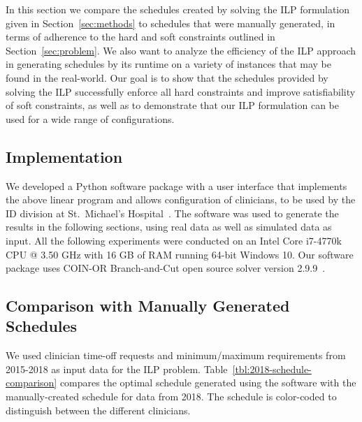 In this section we compare the schedules created by solving the ILP formulation
given in Section~\ref{sec:methods} to schedules that were manually generated,
in terms of adherence to the hard and soft constraints outlined in Section~\ref{sec:problem}.
We also want to analyze the efficiency of the ILP approach in generating schedules
by its runtime on a variety of instances that may be found in the real-world.
Our goal is to show that the schedules provided by solving the ILP successfully
enforce all hard constraints and improve satisfiability of soft constraints, 
as well as to demonstrate that our ILP formulation can be used for a wide range
of configurations.

\subsection{Implementation}
We developed a Python software package with a user interface that implements the above
linear program and allows configuration of clinicians, to be
used by the ID division at St.\ Michael's Hospital~\cite{landsman_scheduling}. 
The software was used to
generate the results in the following sections, using real data as well as
simulated data as input. All the following experiments were conducted on an
Intel Core i7-4770k CPU @ 3.50 GHz with 16 GB of RAM running 64-bit Windows 10.
Our software package uses COIN-OR Branch-and-Cut open source solver
version 2.9.9~\cite{johnjforrest_coin-or/cbc:_2019}.

\subsection{Comparison with Manually Generated Schedules}  %
We used clinician time-off requests and minimum/maximum requirements from
2015-2018 as input data for the ILP problem.
Table~\ref{tbl:2018-schedule-comparison} compares the optimal schedule generated using
the software with the manually-created schedule for data from 2018. The
schedule is color-coded to distinguish between the different clinicians.



